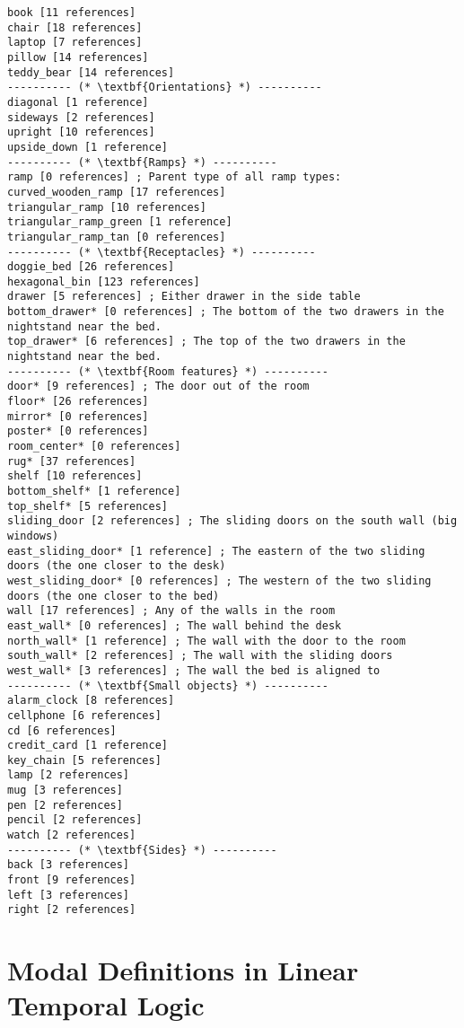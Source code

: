 \documentclass{article}
\begin{document}
\begin{lstlisting}
book [11 references]
chair [18 references]
laptop [7 references]
pillow [14 references]
teddy_bear [14 references]
---------- (* \textbf{Orientations} *) ----------
diagonal [1 reference]
sideways [2 references]
upright [10 references]
upside_down [1 reference]
---------- (* \textbf{Ramps} *) ----------
ramp [0 references] ; Parent type of all ramp types:
curved_wooden_ramp [17 references]
triangular_ramp [10 references]
triangular_ramp_green [1 reference]
triangular_ramp_tan [0 references]
---------- (* \textbf{Receptacles} *) ----------
doggie_bed [26 references]
hexagonal_bin [123 references]
drawer [5 references] ; Either drawer in the side table
bottom_drawer* [0 references] ; The bottom of the two drawers in the nightstand near the bed.
top_drawer* [6 references] ; The top of the two drawers in the nightstand near the bed.
---------- (* \textbf{Room features} *) ----------
door* [9 references] ; The door out of the room
floor* [26 references]
mirror* [0 references]
poster* [0 references]
room_center* [0 references]
rug* [37 references]
shelf [10 references]
bottom_shelf* [1 reference]
top_shelf* [5 references]
sliding_door [2 references] ; The sliding doors on the south wall (big windows)
east_sliding_door* [1 reference] ; The eastern of the two sliding doors (the one closer to the desk)
west_sliding_door* [0 references] ; The western of the two sliding doors (the one closer to the bed)
wall [17 references] ; Any of the walls in the room
east_wall* [0 references] ; The wall behind the desk
north_wall* [1 reference] ; The wall with the door to the room
south_wall* [2 references] ; The wall with the sliding doors
west_wall* [3 references] ; The wall the bed is aligned to
---------- (* \textbf{Small objects} *) ----------
alarm_clock [8 references]
cellphone [6 references]
cd [6 references]
credit_card [1 reference]
key_chain [5 references]
lamp [2 references]
mug [3 references]
pen [2 references]
pencil [2 references]
watch [2 references]
---------- (* \textbf{Sides} *) ----------
back [3 references]
front [9 references]
left [3 references]
right [2 references]
\end{lstlisting}




\section{Modal Definitions in Linear Temporal Logic}
\end{document}

